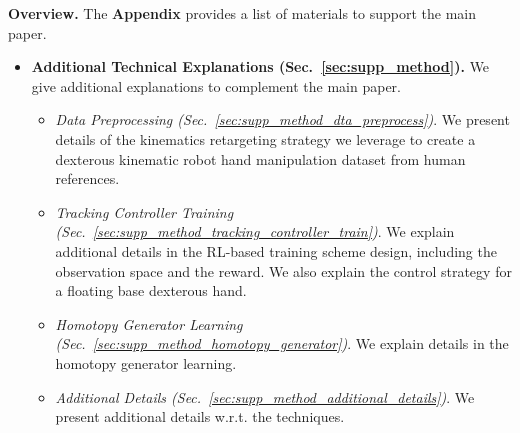 





\noindent\textbf{Overview.} 
The \textbf{Appendix} provides a list of materials to support the main paper. 
\begin{itemize}
    \item \textbf{Additional Technical Explanations (Sec.~\ref{sec:supp_method}).} We give additional explanations to complement the main paper. 
    \begin{itemize}
        \item \textit{Data Preprocessing (Sec.~\ref{sec:supp_method_dta_preprocess})}.  We present details of the kinematics retargeting strategy we leverage to create a dexterous kinematic robot hand manipulation dataset from human references. 
        \item \textit{Tracking Controller Training (Sec.~\ref{sec:supp_method_tracking_controller_train})}. We explain additional details in the RL-based training scheme design, including the observation space and the reward. We also explain the control strategy for a floating base dexterous hand.  
        \item \textit{Homotopy Generator Learning (Sec.~\ref{sec:supp_method_homotopy_generator})}. We explain details in the homotopy generator learning.
        \item  \textit{Additional Details (Sec.~\ref{sec:supp_method_additional_details})}. We present additional details w.r.t. the techniques. 
    \end{itemize}

\end{itemize}
